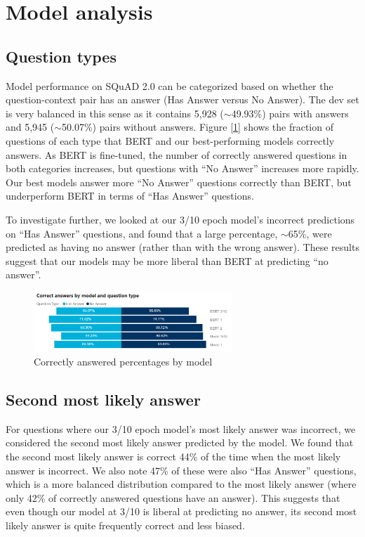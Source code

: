 \section{Model analysis}

\subsection{Question types}

Model performance on SQuAD 2.0 can be categorized based on whether the question-context pair has an answer (Has Answer versus No Answer). The dev set is very balanced in this sense as it contains 5,928 ($\sim$49.93\%) pairs with answers and 5,945 ($\sim$50.07\%) pairs without answers. Figure [\ref{fig:qa_correct_answers_by_model_and_type}] shows the fraction of questions of each type that BERT and our best-performing models correctly answers. As BERT is fine-tuned, the number of correctly answered questions in both categories increases, but questions with “No Answer” increases more rapidly. Our best models answer more “No Answer” questions correctly than BERT, but underperform BERT in terms of “Has Answer” questions.

To investigate further, we looked at our 3/10 epoch model’s incorrect predictions on “Has Answer” questions, and found that a large percentage, $\sim$65\%, were predicted as having no answer (rather than with the wrong answer). These results suggest that our models may be more liberal than BERT at predicting “no answer”.

\begin{figure}[ht]
	\centering
	\includegraphics[width=7.5cm]{images/QA_Correct_Answers_by_Question_Type.png}
	\caption{\label{fig:qa_correct_answers_by_model_and_type}Correctly answered percentages by model}
\end{figure}

\subsection{Second most likely answer}

For questions where our 3/10 epoch model’s most likely answer was incorrect, we considered the second most likely answer predicted by the model. We found that the second most likely answer is correct 44\% of the time when the most likely answer is incorrect. We also note 47\% of these were also “Has Answer” questions, which is a more balanced distribution compared to the most likely answer (where only 42\% of correctly answered questions have an answer). This suggests that even though our model at 3/10 is liberal at predicting no answer, its second most likely answer is quite frequently correct and less biased. 

